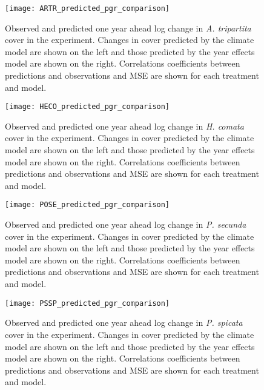 \documentclass[11pt]{article}
\begin{document}
\begin{figure}[!htbp]
	\centering
	\texttt{[image: ARTR\_predicted\_pgr\_comparison]}
	\caption{Observed and predicted one year ahead log change in \textit{A. tripartita} cover in the experiment. Changes in cover predicted by the climate model are shown on the left and those predicted by the year effects model are shown on the right. Correlations coefficients between predictions and observations and MSE are shown for each treatment and model.}
	\label{fig:pgrART}
\end{figure}

\begin{figure}[!htbp]
	\centering
	\texttt{[image: HECO\_predicted\_pgr\_comparison]}
	\caption{Observed and predicted one year ahead log change in \textit{H. comata} cover in the experiment. Changes in cover predicted by the climate model are shown on the left and those predicted by the year effects model are shown on the right. Correlations coefficients between predictions and observations and MSE are shown for each treatment and model. }
	\label{fig:pgrHECO}
\end{figure}

\begin{figure}[!htbp]
	\centering
	\texttt{[image: POSE\_predicted\_pgr\_comparison]}
	\caption{Observed and predicted one year ahead log change in \textit{P. secunda} cover in the experiment. Changes in cover predicted by the climate model are shown on the left and those predicted by the year effects model are shown on the right. Correlations coefficients between predictions and observations and MSE are shown for each treatment and model.}
	\label{fig:pgrPOSE}
\end{figure}

\begin{figure}[!htbp]
	\centering
	\texttt{[image: PSSP\_predicted\_pgr\_comparison]}
	\caption{Observed and predicted one year ahead log change in \textit{P. spicata} cover in the experiment. Changes in cover predicted by the climate model are shown on the left and those predicted by the year effects model are shown on the right. Correlations coefficients between predictions and observations and MSE are shown for each treatment and model.}
	\label{fig:pgrPSSP}
\end{figure}




\clearpage 
\newpage 


\end{document}
